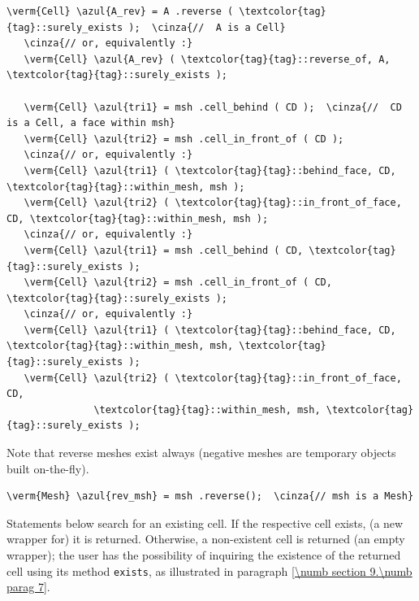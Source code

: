 \begin{Verbatim}[commandchars=\\\{\},formatcom=\small\tt,
   baselinestretch=0.94,framesep=2mm                      ]
   \verm{Cell} \azul{A_rev} = A .reverse ( \textcolor{tag}{tag}::surely_exists );  \cinza{//  A is a Cell}
   \cinza{// or, equivalently :}
   \verm{Cell} \azul{A_rev} ( \textcolor{tag}{tag}::reverse_of, A, \textcolor{tag}{tag}::surely_exists );

   \verm{Cell} \azul{tri1} = msh .cell_behind ( CD );  \cinza{//  CD is a Cell, a face within msh}
   \verm{Cell} \azul{tri2} = msh .cell_in_front_of ( CD );
   \cinza{// or, equivalently :}
   \verm{Cell} \azul{tri1} ( \textcolor{tag}{tag}::behind_face, CD, \textcolor{tag}{tag}::within_mesh, msh );
   \verm{Cell} \azul{tri2} ( \textcolor{tag}{tag}::in_front_of_face, CD, \textcolor{tag}{tag}::within_mesh, msh );
   \cinza{// or, equivalently :}
   \verm{Cell} \azul{tri1} = msh .cell_behind ( CD, \textcolor{tag}{tag}::surely_exists );
   \verm{Cell} \azul{tri2} = msh .cell_in_front_of ( CD, \textcolor{tag}{tag}::surely_exists );
   \cinza{// or, equivalently :}
   \verm{Cell} \azul{tri1} ( \textcolor{tag}{tag}::behind_face, CD, \textcolor{tag}{tag}::within_mesh, msh, \textcolor{tag}{tag}::surely_exists );
   \verm{Cell} \azul{tri2} ( \textcolor{tag}{tag}::in_front_of_face, CD,
               \textcolor{tag}{tag}::within_mesh, msh, \textcolor{tag}{tag}::surely_exists );
\end{Verbatim}

Note that reverse meshes exist always (negative meshes are temporary objects built
on-the-fly).

\begin{Verbatim}[commandchars=\\\{\},formatcom=\small\tt,
   baselinestretch=0.94,framesep=2mm                      ]
   \verm{Mesh} \azul{rev_msh} = msh .reverse();  \cinza{// msh is a Mesh}
\end{Verbatim}

Statements below search for an existing cell.
If the respective cell exists, (a new wrapper for) it is returned.
Otherwise, a non-existent cell is returned
(an empty wrapper); the user has the possibility of inquiring the existence
of the returned cell using its method {\small\tt exists}, as illustrated in paragraph
\ref{\numb section 9.\numb parag 7}.

